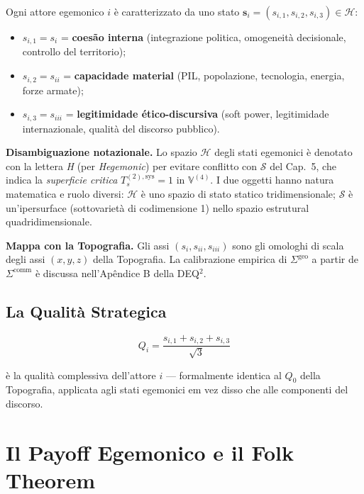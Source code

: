 Ogni attore egemonico \(i\) è caratterizzato da uno stato
\(\mathbf{s}_i = (s_{i,1}, s_{i,2}, s_{i,3}) \in \mathcal{H}\):

\begin{itemize}
\tightlist
\item
  \(s_{i,1} = s_i\) = \textbf{coesão interna} (integrazione politica,
  omogeneità decisionale, controllo del territorio);
\item
  \(s_{i,2} = s_{ii}\) = \textbf{capacidade material} (PIL, popolazione,
  tecnologia, energia, forze armate);
\item
  \(s_{i,3} = s_{iii}\) = \textbf{legitimidade ético-discursiva} (soft
  power, legitimidade internazionale, qualità del discorso pubblico).
\end{itemize}

\Hypoth{} \textbf{Disambiguazione notazionale.} Lo spazio
\(\mathcal{H}\) degli stati egemonici è denotato con la lettera \emph{H}
(per \emph{Hegemonic}) per evitare conflitto con \(\mathcal{S}\) del
Cap.~5, che indica la \emph{superficie critica}
\(T_s^{(2),\text{sys}} = 1\) in \(\mathbb{V}^{(4)}\). I due oggetti
hanno natura matematica e ruolo diversi: \(\mathcal{H}\) è uno spazio di
stato statico tridimensionale; \(\mathcal{S}\) è un'ipersurface
(sottovarietà di codimensione 1) nello spazio estrutural
quadridimensionale.

\Hypoth{} \textbf{Mappa con la Topografia.} Gli assi
\((s_i, s_{ii}, s_{iii})\) sono gli omologhi di scala degli assi
\((x, y, z)\) della Topografia. La calibrazione empirica di
\(\Sigma^{\text{geo}}\) a partir de \(\Sigma^{\text{comm}}\) è discussa
nell'Apêndice B della DEQ$^2$.

\subsection{La Qualità Strategica}\label{la-qualituxe0-strategica}

\[
Q_i = \frac{s_{i,1} + s_{i,2} + s_{i,3}}{\sqrt{3}}
\]

è la qualità complessiva dell'attore \(i\) --- formalmente identica al
\(Q_0\) della Topografia, applicata agli stati egemonici em vez disso che alle
componenti del discorso.



\section{Il Payoff Egemonico e il Folk
Theorem}\label{il-payoff-egemonico-e-il-folk-theorem}

